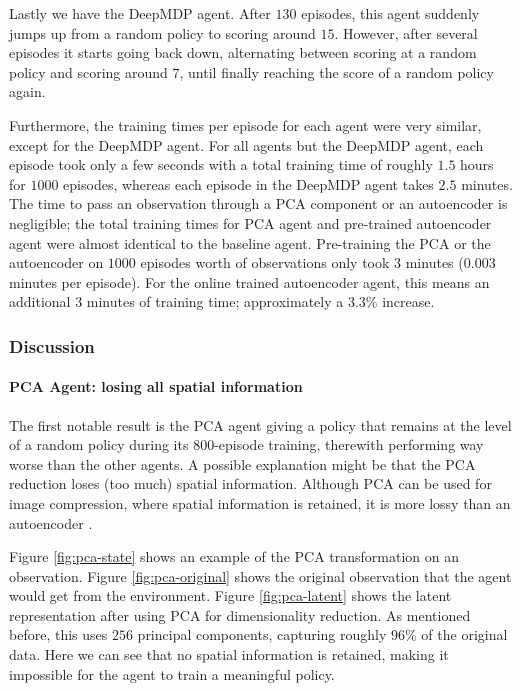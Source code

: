 Lastly we have the DeepMDP agent. After $130$ episodes, this agent suddenly jumps up from a random policy to scoring around $15$. However, after several episodes it starts going back down, alternating between scoring at a random policy and scoring around $7$, until finally reaching the score of a random policy again. 

Furthermore, the training times per episode for each agent were very similar, except for the DeepMDP agent. For all agents but the DeepMDP agent, each episode took only a few seconds with a total training time of roughly $1.5$ hours for $1000$ episodes, whereas each episode in the DeepMDP agent takes $2.5$ minutes. The time to pass an observation through a PCA component or an autoencoder is negligible; the total training times for PCA agent and pre-trained autoencoder agent were almost identical to the baseline agent. Pre-training the PCA or the autoencoder on $1000$ episodes worth of observations only took $3$ minutes ($0.003$ minutes per episode). For the online trained autoencoder agent, this means an additional $3$ minutes of training time; approximately a $3.3\%$ increase.

\subsubsection{Discussion}\label{research-discussion-pysc2}
\paragraph{PCA Agent: losing all spatial information}
The first notable result is the PCA agent giving a policy that remains at the level of a random policy during its $800$-episode training, therewith performing way worse than the other agents. A possible explanation might be that the PCA reduction loses (too much) spatial information. Although PCA can be used for image compression, where spatial information is retained, it is more lossy than an autoencoder \cite{pca_ae}.

Figure \ref{fig:pca-state} shows an example of the PCA transformation on an observation. Figure \ref{fig:pca-original} shows the original observation that the agent would get from the environment. Figure \ref{fig:pca-latent} shows the latent representation after using PCA for dimensionality reduction. As mentioned before, this uses $256$ principal components, capturing roughly $96\%$ of the original data. Here we can see that no spatial information is retained, making it impossible for the agent to train a meaningful policy. 

